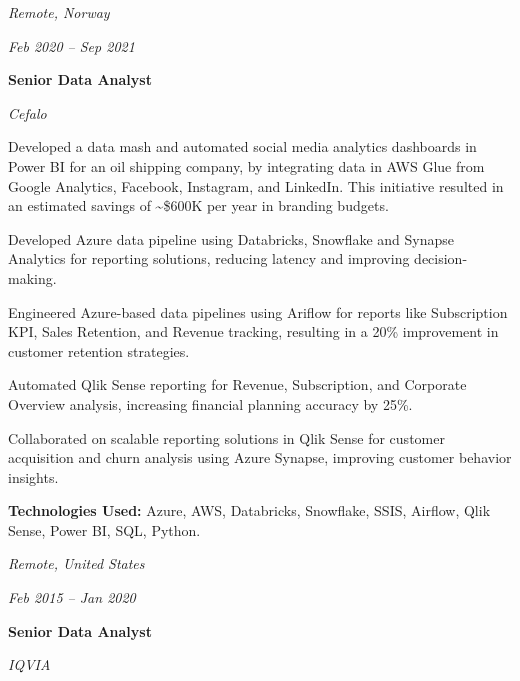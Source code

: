     
    \vspace{0.2 cm}

    \begin{twocolentry}{
        \textit{Remote, Norway}    
    
        \textit{Feb 2020 – Sep 2021}}
        \textbf{Senior Data Analyst}
        
        \textit{Cefalo}
    \end{twocolentry}
    
    \vspace{0.10 cm}
    \begin{onecolentry}
        \begin{highlights}
            \item Developed a data mash and automated social media analytics dashboards in Power BI for an oil shipping company, by integrating data in AWS Glue from Google Analytics, Facebook, Instagram, and LinkedIn. This initiative resulted in an estimated savings of \textasciitilde\$600K per year in branding budgets.
            \item Developed Azure data pipeline using Databricks, Snowflake and Synapse Analytics for reporting solutions, reducing latency and improving decision-making.
            \item Engineered Azure-based data pipelines using Ariflow for reports like Subscription KPI, Sales Retention, and Revenue tracking, resulting in a 20\% improvement in customer retention strategies.
            \item Automated Qlik Sense reporting for Revenue, Subscription, and Corporate Overview analysis, increasing financial planning accuracy by 25\%.
            \item Collaborated on scalable reporting solutions in Qlik Sense for customer acquisition and churn analysis using Azure Synapse, improving customer behavior insights.
    
            \textbf{Technologies Used:} Azure, AWS, Databricks, Snowflake, SSIS, Airflow, Qlik Sense, Power BI, SQL, Python.
         \end{highlights}
    \end{onecolentry}



    \vspace{0.2 cm}

    \begin{twocolentry}{
        \textit{Remote, United States}    
    
        \textit{Feb 2015 – Jan 2020}}
        \textbf{Senior Data Analyst}
        
        \textit{IQVIA}
    \end{twocolentry}
    
